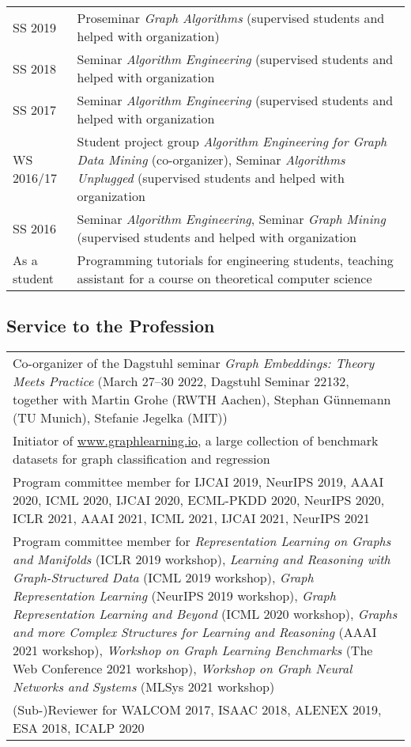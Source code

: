 \documentclass[11pt, a4paper, DIV=12]{scrartcl}
\begin{document}
\begin{tabular}{p{2.1cm}p{12.0cm}}
SS 2019&Proseminar \emph{Graph Algorithms} (supervised students and helped with organization)\\
SS 2018&Seminar \emph{Algorithm Engineering} (supervised students and helped with organization\\
SS 2017&Seminar \emph{Algorithm Engineering} (supervised students and helped with organization\\
WS 2016/17&Student project group \emph{Algorithm Engineering for Graph Data Mining} (co-organizer), Seminar \emph{Algorithms Unplugged} (supervised students and helped with organization\\
SS 2016& Seminar \emph{Algorithm Engineering}, Seminar \emph{Graph Mining} (supervised students and helped with organization\\
As a student&Programming tutorials for engineering students, teaching assistant for a course on theoretical computer science\\
\end{tabular}

\subsection*{Service to the Profession}


\begin{tabular}{p{14.5cm}}
Co-organizer of the Dagstuhl seminar \emph{Graph Embeddings: Theory Meets Practice} (March 27–30 2022, Dagstuhl Seminar 22132, together with Martin Grohe (RWTH Aachen), Stephan Günnemann (TU Munich), Stefanie Jegelka (MIT)) \\[0.5em]

Initiator of \url{www.graphlearning.io}, a large collection of benchmark datasets for graph classification and regression\\[0.5em]
	
Program committee member for IJCAI 2019, NeurIPS  2019, AAAI 2020, ICML 2020, IJCAI 2020, ECML-PKDD 2020,  NeurIPS 2020, ICLR 2021, AAAI 2021, ICML 2021, IJCAI 2021, NeurIPS 2021\\[0.5em]

Program committee member for \emph{Representation Learning on Graphs and Manifolds} (ICLR 2019 workshop), \emph{Learning and Reasoning with Graph-Structured Data} (ICML 2019 workshop), \emph{Graph Representation Learning} (NeurIPS 2019 workshop), \emph{Graph Representation Learning and Beyond} (ICML 2020 workshop), \emph{Graphs and more Complex Structures for Learning and Reasoning} (AAAI 2021 workshop), \emph{Workshop on Graph Learning Benchmarks} (The Web Conference 2021 workshop), \emph{Workshop on Graph Neural Networks and Systems} (MLSys 2021 workshop)
\\[0.5em]

(Sub-)Reviewer for WALCOM 2017, ISAAC 2018, ALENEX 2019, ESA 2018, ICALP 2020 \\[0.5em]


\end{tabular}
\end{document}
